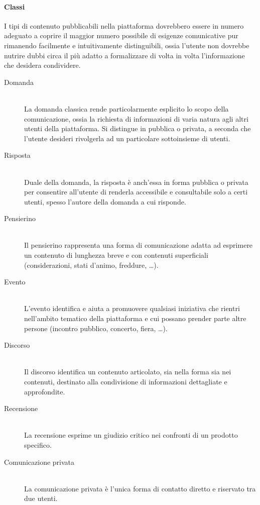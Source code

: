\paragraph{Classi}
I tipi di contenuto pubblicabili nella piattaforma dovrebbero essere in numero adeguato a coprire il maggior numero possibile di esigenze comunicative pur rimanendo facilmente e intuitivamente distinguibili, ossia l'utente non dovrebbe nutrire dubbi circa il più adatto a formalizzare di volta in volta l'informazione che desidera condividere.
\begin{description}
\item[Domanda] \hfill \\
La domanda classica rende particolarmente esplicito lo scopo della comunicazione, ossia la richiesta di informazioni di varia natura agli altri utenti della piattaforma. Si distingue in pubblica o privata, a seconda che l'utente desideri rivolgerla ad un particolare sottoinsieme di utenti. 
\item[Risposta] \hfill \\
Duale della domanda, la risposta è anch'essa in forma pubblica o privata per consentire all'utente di renderla accessibile e consultabile solo a certi utenti, spesso l'autore della domanda a cui risponde.
\item[Pensierino] \hfill \\
Il pensierino rappresenta una forma di comunicazione adatta ad esprimere un contenuto di lunghezza breve e con contenuti superficiali (considerazioni, stati d'animo, freddure, \ldots).
\item[Evento] \hfill \\
L'evento identifica e aiuta a promuovere qualsiasi iniziativa che rientri nell'ambito tematico della piattaforma e cui possano prender parte altre persone (incontro pubblico, concerto, fiera, \ldots).
\item[Discorso] \hfill \\
Il discorso identifica un contenuto articolato, sia nella forma sia nei contenuti, destinato alla condivisione di informazioni dettagliate e approfondite.
\item[Recensione] \hfill \\
La recensione esprime un giudizio critico nei confronti di un prodotto specifico. 
\item[Comunicazione privata] \hfill \\
La comunicazione privata è l'unica forma di contatto diretto e riservato tra due utenti.
\end{description}

